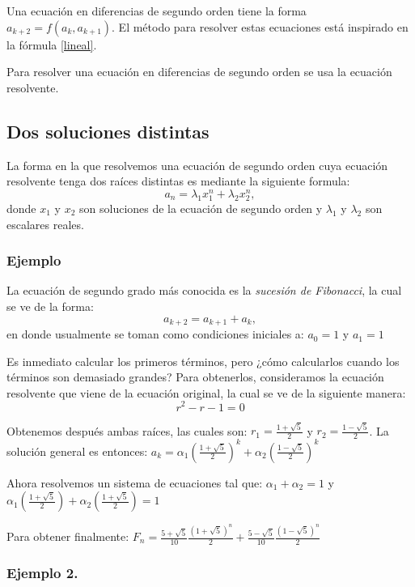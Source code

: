 \documentclass{article}
\begin{document}
Una ecuación en diferencias de segundo orden tiene la forma $a_{k+2}=f(a_k,a_{k+1})$.
El método para resolver estas ecuaciones está inspirado en la fórmula \ref{lineal}.

Para resolver una ecuación en diferencias de segundo orden se usa la ecuación resolvente.



\subsection{Dos soluciones distintas}
\label{sec:distintas}
La forma en la que resolvemos una ecuación de segundo orden cuya
ecuación resolvente tenga dos raíces distintas es mediante la
siguiente formula:
\begin{equation}
 \label{raicesdistintas}
 a_n=\lambda_1x_1^n +\lambda_2x_2^n,
\end{equation}
donde $x_1$ y $x_2$ son soluciones de la ecuación de segundo orden y
$\lambda_1$ y $\lambda_2$ son escalares reales.
\subsubsection{Ejemplo}

La ecuación de segundo grado más conocida es la \textit{sucesión de
  Fibonacci}, la cual se ve de la forma:
\begin{equation}
  \label{eq:fibonacci}
a_{k+2}=a_{k+1}+a_{k},  
\end{equation}
en donde usualmente se toman como condiciones iniciales a: $a_{0}=1$ y $a_{1}=1$

Es inmediato calcular los primeros términos, pero ¿cómo calcularlos
cuando los términos son demasiado grandes?  Para obtenerlos,
consideramos la ecuación resolvente que viene de la ecuación original,
la cual se ve de la siguiente manera:
$$r^2-r-1=0$$

Obtenemos después ambas raíces, las cuales son:
$r_{1}= \frac{1+\sqrt{5}}{2}$ y $r_{2}=\frac{1-\sqrt{5}}{2}$. La
solución general es entonces:
$a_{k}=\alpha_{1}(\frac{1+\sqrt{5}}{2})^{k} +
\alpha_{2}(\frac{1-\sqrt{5}}{2})^k$

Ahora resolvemos un sistema de ecuaciones tal que:
$\alpha_{1} + \alpha_{2}= 1$ y
$\alpha_{1}(\frac{1+\sqrt{5}}{2}) + \alpha_{2}(\frac{1+\sqrt{5}}{2})=1$

Para obtener finalmente:
$F_{n}= \frac{5+\sqrt{5}}{10}\frac{(1+\sqrt{5})^n}{2} +
\frac{5-\sqrt{5}}{10}\frac{(1-\sqrt{5})^n}{2}$

\subsubsection{Ejemplo 2.}
\label{sec:fichas}
\end{document}
